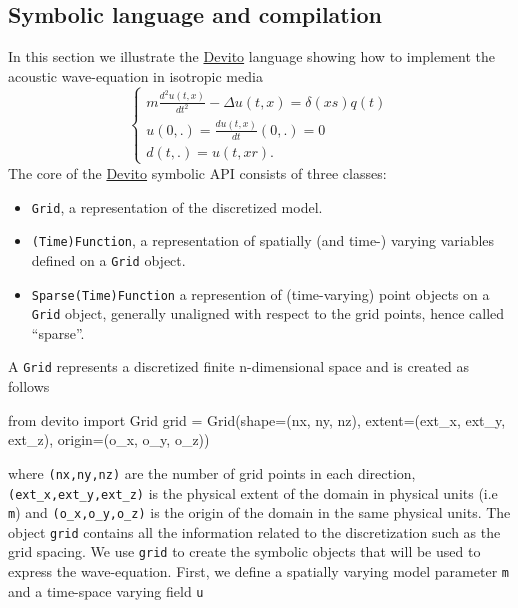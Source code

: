 \documentclass[conference]{IEEEtran}
\begin{document}
\subsection{Symbolic language and
compilation}\label{symbolic-language-and-compilation}

In this section we illustrate the
\href{https://github.com/devitocodes/devito}{Devito} language showing
how to implement the acoustic wave-equation in isotropic media
%
\begin{equation}
\begin{cases}
 m \frac{d^2 u(t, x)}{dt^2} - \Delta u(t, x) = \delta(xs) q(t) \\
 u(0, .) = \frac{d u(t, x)}{dt}(0, .) = 0 \\
 d(t, .) = u(t, xr).
 \end{cases}
\label{acou}
\end{equation}
%
 The core of the \href{https://github.com/devitocodes/devito}{Devito}
symbolic API consists of three classes:

\begin{itemize}
\itemsep1pt\parskip0pt
\item
  \texttt{Grid}, a representation of the discretized model.
\item
  \texttt{(Time)Function}, a representation of spatially (and time-)
  varying variables defined on a \texttt{Grid} object.
\item
  \texttt{Sparse(Time)Function} a represention of (time-varying) point
  objects on a \texttt{Grid} object, generally unaligned with respect to
  the grid points, hence called ``sparse''.
\end{itemize}

A \texttt{Grid} represents a discretized finite n-dimensional space and
is created as follows

\begin{python}
from devito import Grid
grid = Grid(shape=(nx, ny, nz),
            extent=(ext_x, ext_y, ext_z),
            origin=(o_x, o_y, o_z))
\end{python}

where \texttt{(nx,\phantom{\ }ny,\phantom{\ }nz)} are the number of grid
points in each direction,
\texttt{(ext\_x,\phantom{\ }ext\_y,\phantom{\ }ext\_z)} is the physical
extent of the domain in physical units (i.e \texttt{m}) and
\texttt{(o\_x,\phantom{\ }o\_y,\phantom{\ }o\_z)} is the origin of the
domain in the same physical units. The object \texttt{grid} contains all
the information related to the discretization such as the grid spacing.
We use \texttt{grid} to create the symbolic objects that will be used to
express the wave-equation. First, we define a spatially varying model
parameter \texttt{m} and a time-space varying field \texttt{u}
\end{document}

